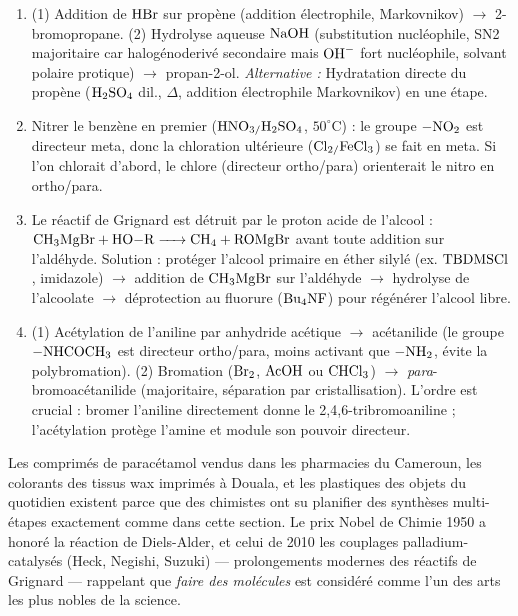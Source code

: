 \documentclass[11pt]{article}
\begin{document}
\begin{corrige}
\begin{enumerate}
\item (1) Addition de $\ce{HBr}$ sur propène (addition électrophile, Markovnikov) $\rightarrow$ 2-bromopropane. (2) Hydrolyse aqueuse $\ce{NaOH}$ (substitution nucléophile, SN2 majoritaire car halogénoderivé secondaire mais $\ce{OH-}$ fort nucléophile, solvant polaire protique) $\rightarrow$ propan-2-ol. \textit{Alternative :} Hydratation directe du propène ($\ce{H2SO4}$ dil., $\Delta$, addition électrophile Markovnikov) en une étape.
\item Nitrer le benzène en premier ($\ce{HNO3/H2SO4}$, $50^{\circ}\mathrm{C}$) : le groupe $\ce{-NO2}$ est directeur meta, donc la chloration ultérieure ($\ce{Cl2/FeCl3}$) se fait en meta. Si l'on chlorait d'abord, le chlore (directeur ortho/para) orienterait le nitro en ortho/para.
\item Le réactif de Grignard est détruit par le proton acide de l'alcool : $\ce{CH3MgBr + HO-R -> CH4 + ROMgBr}$ avant toute addition sur l'aldéhyde. Solution : protéger l'alcool primaire en éther silylé (ex. $\ce{TBDMSCl}$, imidazole) $\rightarrow$ addition de $\ce{CH3MgBr}$ sur l'aldéhyde $\rightarrow$ hydrolyse de l'alcoolate $\rightarrow$ déprotection au fluorure ($\ce{Bu4NF}$) pour régénérer l'alcool libre.
\item (1) Acétylation de l'aniline par anhydride acétique $\rightarrow$ acétanilide (le groupe $\ce{-NHCOCH3}$ est directeur ortho/para, moins activant que $\ce{-NH2}$, évite la polybromation). (2) Bromation ($\ce{Br2}$, $\ce{AcOH}$ ou $\ce{CHCl3}$) $\rightarrow$ \emph{para}-bromoacétanilide (majoritaire, séparation par cristallisation). L'ordre est crucial : bromer l'aniline directement donne le 2,4,6-tribromoaniline ; l'acétylation protège l'amine et module son pouvoir directeur.
\end{enumerate}
\end{corrige}

\begin{savaistu}
Les comprimés de paracétamol vendus dans les pharmacies du Cameroun, les colorants des tissus wax imprimés à Douala, et les plastiques des objets du quotidien existent parce que des chimistes ont su planifier des synthèses multi-étapes exactement comme dans cette section. Le prix Nobel de Chimie 1950 a honoré la réaction de Diels-Alder, et celui de 2010 les couplages palladium-catalysés (Heck, Negishi, Suzuki) — prolongements modernes des réactifs de Grignard — rappelant que \emph{faire des molécules} est considéré comme l'un des arts les plus nobles de la science.
\end{savaistu}
\end{document}
